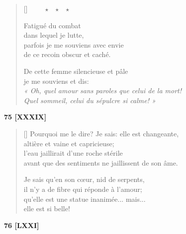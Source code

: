 \documentclass[a4paper,12pt]{book}
\begin{document}
\begin{verse}[\versewidth]
  $\ \ \ \ \ \ \ \ \ \star \ \ \ \star \ \ \ \star$

  Fatigué du combat \\
  dans lequel je lutte, \\
  parfois je me souviens avec envie \\
  de ce recoin obscur et caché.

  De cette femme silencieuse et pâle \\
  je me souviens et dis: \\
  \emph{« Oh, quel amour sans paroles que celui de la mort! \\
    Quel sommeil, celui du sépulcre si calme! »}
\end{verse}

\bigskip

\begin{center}
  \textbf{75 [XXXIX]}
\end{center}

\settowidth{\versewidth}{Pourquoi me le dire? Je sais: elle est changeante,}

\begin{verse}[\versewidth]
  Pourquoi me le dire? Je sais: elle est changeante, \\
  altière et vaine et capricieuse; \\
  l'eau jaillirait d'une roche stérile \\
  avant que des sentiments ne jaillissent de son âme.

  Je sais qu'en son cœur, nid de serpents, \\
  il n'y a de fibre qui réponde à l'amour; \\
  qu'elle est une statue inanimée... mais... \\
  elle est si belle!
\end{verse}

\bigskip

\begin{center}
  \textbf{76 [LXXI]}
\end{center}

\end{document}

